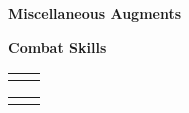 \begin{multicols}{2}
\end{multicols}
\begin{multicols}{2}
\end{multicols}
\vspace{8mm}
\textbf{\large Miscellaneous Augments}\\
\par
\textbf{\large Combat Skills}\\
\begin{multicols}{2}
	\begin{tabular}{rl}
		\rangedcombatskills
	\end{tabular}
	\begin{tabular}{rl}
		\meleecombatskills
	\end{tabular}
\end{multicols}